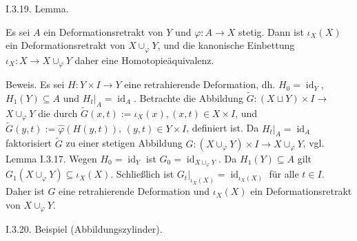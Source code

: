 \documentclass[10pt, letterpaper]{article}
\begin{document}
I.3.19. Lemma. 


Es sei $A$ ein Deformationsretrakt von $Y$ und $\varphi: A \rightarrow X$ stetig. Dann ist $\iota_{X}(X)$ ein Deformationsretrakt von $X \cup_{\varphi} Y$, und die kanonische Einbettung $\iota_{X}: X \rightarrow X \cup_{\varphi} Y$ daher eine Homotopieäquivalenz.

Beweis. Es sei $H: Y \times I \rightarrow Y$ eine retrahierende Deformation, dh. $H_{0}=\operatorname{id}_{Y}$, $H_{1}(Y) \subseteq A$ und $\left.H_{t}\right|_{A}=\operatorname{id}_{A}$. Betrachte die Abbildung $\tilde{G}:(X \sqcup Y) \times I \rightarrow$ $X \cup_{\varphi} Y$ die durch $\tilde{G}(x, t):=\iota_{X}(x),(x, t) \in X \times I$, und $\tilde{G}(y, t):=\hat{\varphi}(H(y, t))$, $(y, t) \in Y \times I$, definiert ist. Da $\left.H_{t}\right|_{A}=\operatorname{id}_{A}$ faktorisiert $\tilde{G}$ zu einer stetigen Abbildung $G:\left(X \cup_{\varphi} Y\right) \times I \rightarrow X \cup_{\varphi} Y$, vgl. Lemma I.3.17. Wegen $H_{0}=\operatorname{id}_{Y}$ ist $G_{0}=\operatorname{id}_{X \cup_{\varphi} Y}$. Da $H_{1}(Y) \subseteq A$ gilt $G_{1}\left(X \cup_{\varphi} Y\right) \subseteq \iota_{X}(X)$. Schließlich ist $\left.G_{t}\right|_{\iota_{X}(X)}=\operatorname{id}_{\iota_{X}(X)}$ für alle $t \in I$. Daher ist $G$ eine retrahierende Deformation und $\iota_{X}(X)$ ein Deformationsretrakt von $X \cup_{\varphi} Y$.


I.3.20. Beispiel (Abbildungszylinder). 
\end{document}
